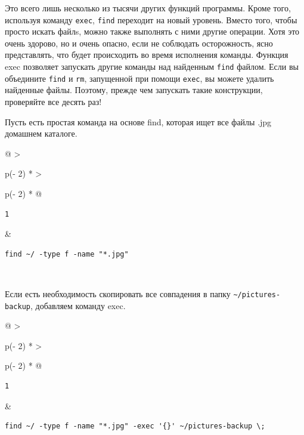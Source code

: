 \documentclass{article}
\begin{document}
Это всего лишь несколько из тысячи других функций программы. Кроме того,
используя команду \texttt{exec}, \texttt{find} переходит на новый
уровень. Вместо того, чтобы просто искать файлs, можно также выполнять с
ними другие операции. Хотя это очень здорово, но и очень опасно, если не
соблюдать осторожность, ясно представлять, что будет происходить во
время исполнения команды. Функция exec позволяет запускать другие
команды над найденным \texttt{find} файлом. Если вы объедините
\texttt{find} и \texttt{rm}, запущенной при помощи \texttt{exec}, вы
можете удалить найденные файлы. Поэтому, прежде чем запускать такие
конструкции, проверяйте все десять раз!

Пусть есть простая команда на основе find, которая ищет все файлы .jpg
домашнем каталоге.

\begin{longtable}[]{@{}
  >{\raggedright\arraybackslash}p{(\columnwidth - 2\tabcolsep) * }
  >{\raggedright\arraybackslash}p{(\columnwidth - 2\tabcolsep) * }@{}}
\toprule
\endhead
\begin{minipage}[t]{\linewidth}\raggedright
\begin{verbatim}
1
\end{verbatim}
\end{minipage} & \begin{minipage}[t]{\linewidth}\raggedright
\begin{verbatim}
find ~/ -type f -name "*.jpg"
\end{verbatim}
\end{minipage} \\ \addlinespace
\bottomrule
\end{longtable}

Если есть необходимость скопировать все совпадения в папку
\texttt{\textasciitilde{}/pictures-backup}, добавляем команду exec.

\begin{longtable}[]{@{}
  >{\raggedright\arraybackslash}p{(\columnwidth - 2\tabcolsep) * }
  >{\raggedright\arraybackslash}p{(\columnwidth - 2\tabcolsep) * }@{}}
\toprule
\endhead
\begin{minipage}[t]{\linewidth}\raggedright
\begin{verbatim}
1
\end{verbatim}
\end{minipage} & \begin{minipage}[t]{\linewidth}\raggedright
\begin{verbatim}
find ~/ -type f -name "*.jpg" -exec '{}' ~/pictures-backup \;
\end{verbatim}
\end{minipage} \\ \addlinespace
\bottomrule
\end{longtable}
\end{document}
